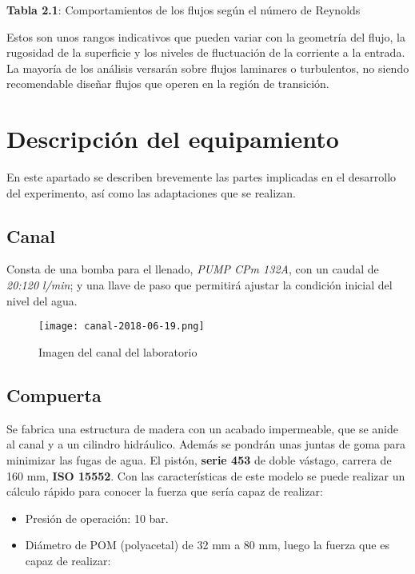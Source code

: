 \textbf{Tabla 2.1}: Comportamientos de los flujos según el número de
Reynolds \cite{Mataix82}

Estos son unos rangos indicativos que pueden variar con la geometría del
flujo, la rugosidad de la superficie y los niveles de fluctuación de la
corriente a la entrada. La mayoría de los análisis versarán sobre flujos
laminares o turbulentos, no siendo recomendable diseñar flujos que
operen en la región de transición.

\section{Descripción del equipamiento}\label{header-n133}

En este apartado se describen brevemente las partes implicadas en el
desarrollo del experimento, así como las adaptaciones que se realizan.

\subsection{Canal}\label{header-n136}

Consta de una bomba para el llenado, \emph{PUMP CPm 132A}, con un caudal
de \emph{20:120 l/min}; y una llave de paso que permitirá ajustar la
condición inicial del nivel del agua.

\begin{figure}
\centering
\texttt{[image: canal-2018-06-19.png]}
\caption{Imagen del canal del laboratorio}
\label{fig:canal2d}
\end{figure}

\subsection{Compuerta}\label{header-n143}

Se fabrica una estructura de madera con un acabado impermeable, que se
anide al canal y a un cilindro hidráulico. Además se pondrán unas juntas
de goma para minimizar las fugas de agua. El pistón, \textbf{serie 453}
de doble vástago, carrera de 160 mm, \textbf{ISO 15552}. Con las
características de este modelo se puede realizar un cálculo rápido para
conocer la fuerza que sería capaz de realizar:

\begin{itemize}
\item
  Presión de operación: 10 bar.
\item
  Diámetro de POM (polyacetal) de 32 mm a 80 mm, luego la fuerza que es
  capaz de realizar:
\end{itemize}


